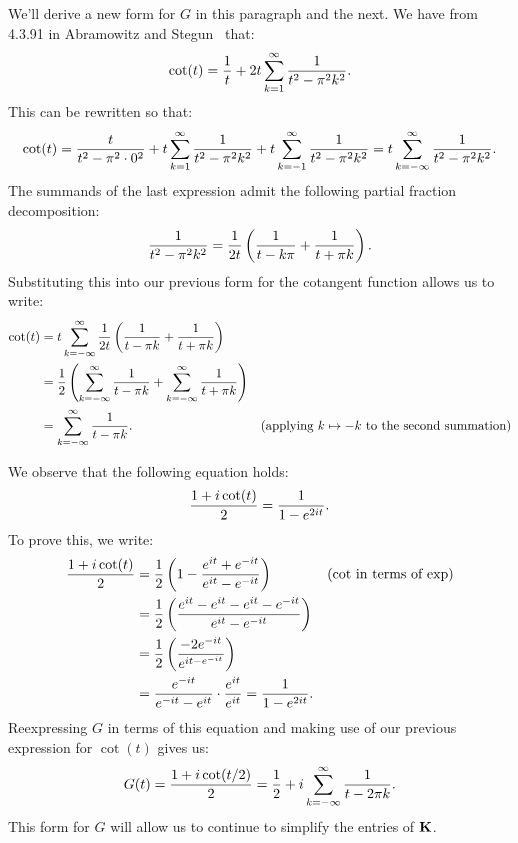 We'll derive a new form for $G$ in this paragraph and
the next. We have from 4.3.91 in Abramowitz and Stegun~\cite{abramowitz-and-stegun} that:
\begin{align*}
  \cot(t) = {1 \over t} + 2t \sum_{k=1}^\infty {1 \over t^2 - \pi^2 k^2}.
\end{align*}
This can be rewritten so that:
\begin{align*}
  \cot(t) = {t \over t^2 - \pi^2 \cdot 0^2} + t \sum_{k=1}^\infty {1 \over t^2 - \pi^2 k^2} + t \sum_{k=-1}^\infty {1 \over t^2 - \pi^2 k^2} = t \sum_{k=-\infty}^\infty {1 \over t^2 - \pi^2 k^2}.
\end{align*}
The summands of the last expression admit the following partial
fraction decomposition:
\begin{align*}
  {1 \over t^2 - \pi^2 k^2} = {1 \over 2t} \left({1 \over t - k \pi} + {1 \over t + \pi k}\right).
\end{align*}
Substituting this into our previous form for the cotangent function
allows us to write:
\begin{align*}
  \cot(t)
  &= t \sum_{k=-\infty}^\infty {1 \over 2t} \left({1 \over t - \pi k} + {1 \over t + \pi k}\right) \\
  &= {1 \over 2} \left(\sum_{k = -\infty}^\infty {1 \over t - \pi k} + \sum_{k=-\infty}^\infty {1 \over t + \pi k}\right) \\
  &= \sum_{k=-\infty}^\infty {1 \over t - \pi k}. & \mbox{(applying $k \mapsto -k$ to the second summation)}
\end{align*}

We observe that the following equation holds:
\begin{align*}
  {1 + i \cot(t) \over 2} = {1 \over 1 - e^{2it}}.
\end{align*}
To prove this, we write:
\begin{align*}
  {1 + i \cot(t) \over 2} &= {1 \over 2} \left(1 - {e^{it} + e^{-it} \over e^{it} - e^{-it}}\right) & \mbox{($\cot$ in terms of $\exp$)} \\
  &= {1 \over 2} \left(e^{it} - e^{it} - e^{it} - e^{-it} \over e^{it} - e^{-it}\right) \\
  &= {1 \over 2} \left(-2e^{-it} \over e^{it - e^{-it}}\right) \\
  &= {e^{-it} \over e^{-it} - e^{it}} \cdot {e^{it} \over e^{it}} = {1 \over 1 - e^{2it}}.
\end{align*}
Reexpressing $G$ in terms of this equation and making use of our
previous expression for $\cot(t)$ gives us:
\begin{align} \label{eqn:G-in-cot-and-G-per-sum}
  G(t) = {1 + i\cot(t/2) \over 2} = {1 \over 2} + i \sum_{k=-\infty}^\infty {1 \over t - 2 \pi k}.
\end{align}
This form for $G$ will allow us to continue to simplify the entries of
$\bold{K}$.

